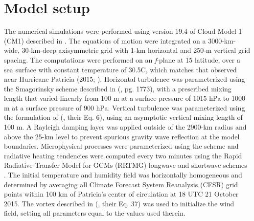 \section{Model setup}
\label{modelsetup}
The numerical simulations were performed using version 19.4 of Cloud Model 1 (CM1) described in \cite{BryanRotunno2009}.
The equations of motion were integrated on a 3000-km-wide, 30-km-deep axisymmetric grid with 1-km horizontal and 250-m vertical grid spacing.
The computations were performed on an \textit{f}-plane at 15 latitude, over a sea surface with constant temperature of 30.5\textdegree C, which matches that observed near Hurricane Patricia (2015; \citeauthor{Kimberlainetal2016} \citeyear{Kimberlainetal2016}).
Horizontal turbulence was parameterized using the Smagorinsky scheme described in \citeauthor{BryanRotunno2009} (\citeyear{BryanRotunno2009}, pg. 1773), with a prescribed mixing length that varied linearly from 100 m at a surface pressure of 1015 hPa to 1000 m at a surface pressure of 900 hPa.
Vertical turbulence was parameterized using the formulation of \citeauthor{MarkowskiBryan2016} (\citeyear{MarkowskiBryan2016}, their Eq. 6), using an asymptotic vertical mixing length of 100 m.
A Rayleigh damping layer was applied outside of the 2900-km radius and above the 25-km level to prevent spurious gravity wave reflection at the model boundaries.
Microphysical processes were parameterized using the \cite{Thompson} scheme and radiative heating tendencies were computed every two minutes using the Rapid Radiative Transfer Model for GCMs (RRTMG) longwave and shortwave schemes \citep{Iacono}.
The initial temperature and humidity field was horizontally homogeneous and determined by averaging all Climate Forecast System Reanalysis (CFSR) grid points within 100 km of Patricia's center of circulation at 18 UTC 21 October 2015.
The vortex described in \citeauthor{RotunnoEmanuel} (\citeyear{RotunnoEmanuel}, their Eq. 37) was used to initialize the wind field, setting all parameters equal to the values used therein.

